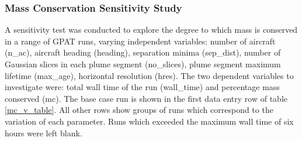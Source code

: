 \subsubsection{Mass Conservation Sensitivity Study}
A sensitivity test was conducted to explore the degree to which mass is conserved in a range of GPAT runs, varying independent variables: number of aircraft (n\_ac), aircraft heading (heading), separation minima (sep\_dist), number of Gaussian slices in each plume segment (no\_slices), plume segment maximum lifetime (max\_age), horizontal resolution (hres). The two dependent variables to investigate were: total wall time of the run (wall\_time) and percentage mass conserved (mc). The base case run is shown in the first data entry row of table \ref{mc_v_table}. All other rows show groups of runs which correspond to the variation of each parameter. Runs which exceeded the maximum wall time of six hours were left blank.

